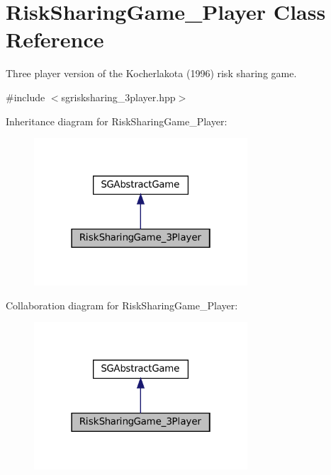 \hypertarget{classRiskSharingGame__3Player}{}\section{Risk\+Sharing\+Game\+\_\+Player Class Reference}
\label{classRiskSharingGame__3Player}


Three player version of the Kocherlakota (1996) risk sharing game.  




{\ttfamily \#include $<$sgrisksharing\+\_\+3player.\+hpp$>$}



Inheritance diagram for Risk\+Sharing\+Game\+\_\+Player\+:
\nopagebreak
\begin{figure}[H]
\begin{center}
\leavevmode
\includegraphics[width=226pt]{classRiskSharingGame__3Player__inherit__graph}
\end{center}
\end{figure}


Collaboration diagram for Risk\+Sharing\+Game\+\_\+Player\+:
\nopagebreak
\begin{figure}[H]
\begin{center}
\leavevmode
\includegraphics[width=226pt]{classRiskSharingGame__3Player__coll__graph}
\end{center}
\end{figure}
